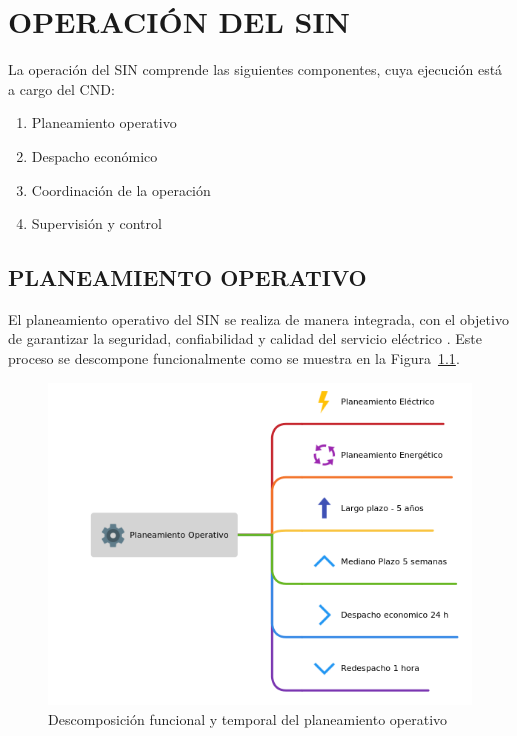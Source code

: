 \documentclass[a5paper]{book}%
\begin{document}
\chapter{OPERACIÓN DEL SIN}

La operación del \ac{SIN} comprende las siguientes componentes, cuya ejecución está a cargo del \ac{CND}:

\begin{enumerate}
    \item Planeamiento operativo
    \item Despacho económico
    \item Coordinación de la operación
    \item Supervisión y control
\end{enumerate}

\section{PLANEAMIENTO OPERATIVO}

El planeamiento operativo del \ac{SIN} se realiza de manera integrada, con el objetivo de garantizar la seguridad, confiabilidad y calidad del servicio eléctrico \cite{CREG0251995}.  
Este proceso se descompone funcionalmente como se muestra en la Figura~\ref{fig:planeamiento-operativo}.

\begin{figure}[H]
    \centering
    \includegraphics[width=1\linewidth]{planeamineto-operativo}
    \caption{Descomposición funcional y temporal del planeamiento operativo}
    \label{fig:planeamiento-operativo}
\end{figure}
\end{document}
